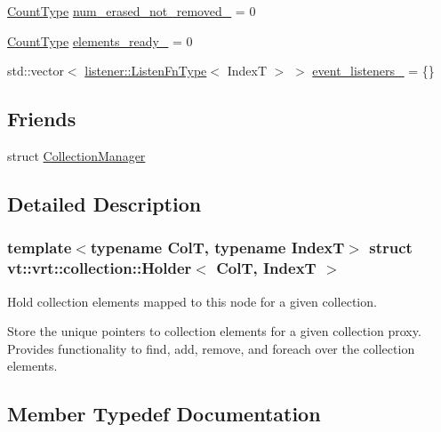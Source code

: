 \begin{DoxyCompactItemize}
\item 
\hyperlink{structvt_1_1vrt_1_1collection_1_1_holder_a3251a556ac19fc7dc4d0bd388cfaedeb}{Count\+Type} \hyperlink{structvt_1_1vrt_1_1collection_1_1_holder_ac6e747cb66d6f44f78c28448a59d8a0a}{num\+\_\+erased\+\_\+not\+\_\+removed\+\_\+} = 0
\item 
\hyperlink{structvt_1_1vrt_1_1collection_1_1_holder_a3251a556ac19fc7dc4d0bd388cfaedeb}{Count\+Type} \hyperlink{structvt_1_1vrt_1_1collection_1_1_holder_afe1f0824cb54316478fb364f0d88ad78}{elements\+\_\+ready\+\_\+} = 0
\item 
std\+::vector$<$ \hyperlink{namespacevt_1_1vrt_1_1collection_1_1listener_a62d04c44a3c187eae66bdba2090b4505}{listener\+::\+Listen\+Fn\+Type}$<$ IndexT $>$ $>$ \hyperlink{structvt_1_1vrt_1_1collection_1_1_holder_aebf918fdc3e2ae3b4cf20a1ceb1a6acf}{event\+\_\+listeners\+\_\+} = \{\}
\end{DoxyCompactItemize}
\subsection*{Friends}
\begin{DoxyCompactItemize}
\item 
struct \hyperlink{structvt_1_1vrt_1_1collection_1_1_holder_af9288b1963f434a90b307b5305a49510}{Collection\+Manager}
\end{DoxyCompactItemize}


\subsection{Detailed Description}
\subsubsection*{template$<$typename ColT, typename IndexT$>$\newline
struct vt\+::vrt\+::collection\+::\+Holder$<$ Col\+T, Index\+T $>$}

Hold collection elements mapped to this node for a given collection. 

Store the unique pointers to collection elements for a given collection proxy. Provides functionality to find, add, remove, and foreach over the collection elements. 

\subsection{Member Typedef Documentation}
\mbox{\label{structvt_1_1vrt_1_1collection_1_1_holder_a38b4a4bfc4408cf28918c32433c80aac}} 
